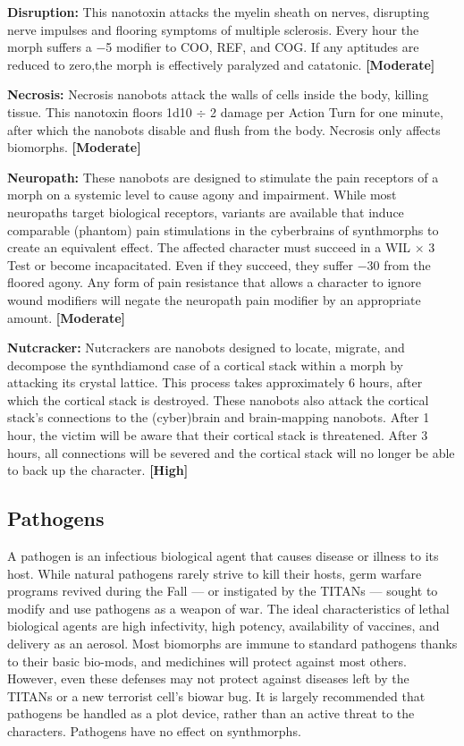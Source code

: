 \textbf{Disruption:} This nanotoxin attacks the myelin sheath on nerves, disrupting nerve impulses and flooring symptoms of multiple sclerosis. Every hour the morph suffers a $-$5 modifier to COO, REF, and COG. If any aptitudes are reduced to zero,the morph is effectively paralyzed and catatonic. \textbf{[Moderate]} 

\textbf{Necrosis:} Necrosis nanobots attack the walls of cells inside the body, killing tissue. This nanotoxin floors 1d10 $\div$ 2 damage per Action Turn for one minute, after which the nanobots disable and flush from the body. Necrosis only affects biomorphs. \textbf{[Moderate]} 

\textbf{Neuropath:} These nanobots are designed to stimulate the pain receptors of a morph on a systemic level to cause agony and impairment. While most neuropaths target biological receptors, variants are available that induce comparable (phantom) pain stimulations in the cyberbrains of synthmorphs to create an equivalent effect. The affected character must succeed in a WIL $\times$ 3 Test or become incapacitated. Even if they succeed, they suffer $-$30 from the floored agony. Any form of pain resistance that allows a character to ignore wound modifiers will negate the neuropath pain modifier by an appropriate amount. \textbf{[Moderate]} 

\textbf{Nutcracker:} Nutcrackers are nanobots designed to locate, migrate, and decompose the synthdiamond case of a cortical stack within a morph by attacking its crystal lattice. This process takes approximately 6 hours, after which the cortical stack is destroyed. These nanobots also attack the cortical stack’s connections to the (cyber)brain and brain-mapping nanobots. After 1 hour, the victim will be aware that their cortical stack is threatened. After 3 hours, all connections will be severed and the cortical stack will no longer be able to back up the character. \textbf{[High]} 



\subsection{Pathogens} \label{sec:pathogens} 

A pathogen is an infectious biological agent that causes disease or illness to its host. While natural pathogens rarely strive to kill their hosts, germ warfare programs revived during the Fall --- or instigated by the TITANs --- sought to modify and use pathogens as a weapon of war. The ideal characteristics of lethal biological agents are high infectivity, high potency, availability of vaccines, and delivery as an aerosol. Most biomorphs are immune to standard pathogens thanks to their basic bio-mods, and medichines will protect against most others. However, even these defenses may not protect against diseases left by the TITANs or a new terrorist cell’s biowar bug. It is largely recommended that pathogens be handled as a plot device, rather than an active threat to the characters. Pathogens have no effect on synthmorphs. 

